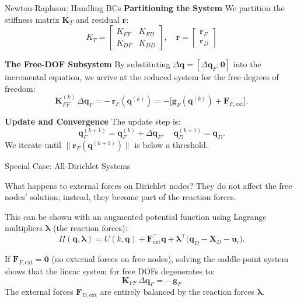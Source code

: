 \documentclass{beamer}
\begin{document}
\begin{frame}[fragile]{Newton-Raphson: Handling BCs}
    \textbf{Partitioning the System}
    We partition the stiffness matrix $\mathbf{K}_T$ and residual $\mathbf{r}$:
    \[ K_T=\begin{bmatrix}K_{F F} & K_{F D} \\ K_{D F} & K_{D D}\end{bmatrix}, \quad \mathbf{r}=\begin{bmatrix}\mathbf{r}_F \\ \mathbf{r}_D\end{bmatrix} \]
    
    \textbf{The Free-DOF Subsystem}
    By substituting $\Delta\mathbf{q}=[\Delta\mathbf{q}_F;\mathbf{0}]$ into the incremental equation, we arrive at the reduced system for the free degrees of freedom:
    \[
      \mathbf{K}_{FF}^{(k)}\,\Delta\mathbf{q}_F = -\,\mathbf{r}_F(\mathbf{q}^{(k)}) = -\bigl[\mathbf{g}_F(\mathbf{q}^{(k)}) + \mathbf{F}_{F,\text{ext}}\bigr].
    \]
    
    \textbf{Update and Convergence}
    The update step is:
    \[
        \mathbf{q}_F^{(k+1)} = \mathbf{q}_F^{(k)} + \Delta\mathbf{q}_F, \quad \mathbf{q}_D^{(k+1)} = \mathbf{q}_D.
    \]
    We iterate until $\lVert\mathbf{r}_F(\mathbf{q}^{(k+1)})\rVert$ is below a threshold.
\end{frame}

\begin{frame}[fragile]{Special Case: All-Dirichlet Systems}
    \begin{alertblock}{What happens to external forces on Dirichlet nodes?}
    They do not affect the free nodes' solution; instead, they become part of the reaction forces.
    \end{alertblock}
    
    This can be shown with an augmented potential function using Lagrange multipliers $\boldsymbol\lambda$ (the reaction forces):
    \[
        \Pi(\mathbf{q},\boldsymbol\lambda) = U(k, \mathbf{q}) + \mathbf{F}_{\text{ext}}^{\!\top}\mathbf{q} + \boldsymbol\lambda^{\!\top} \bigl(\mathbf{q}_D - \mathbf{X}_D - \mathbf{u}_i\bigr).
    \]
    
    If $\mathbf{F}_{F,\text{ext}} = \mathbf{0}$ (no external forces on free nodes), solving the saddle-point system shows that the linear system for free DOFs degenerates to:
    \[
        \boxed{ \mathbf{K}_{FF}\,\Delta\mathbf{q}_F = -\,\mathbf{g}_F }
    \]
    The external forces $\mathbf{F}_{D,\text{ext}}$ are entirely balanced by the reaction forces $\boldsymbol{\lambda}$.
\end{frame}
\end{document}
